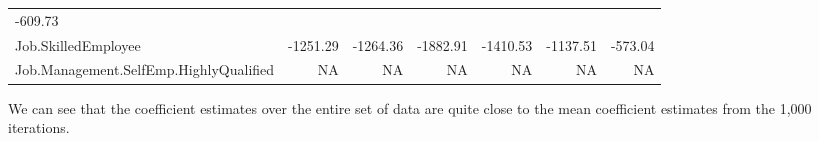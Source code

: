 \documentclass[]{article}
\begin{document}
\begin{longtable}[]{@{}lrrrrrr@{}}
\begin{minipage}[t]{0.08\columnwidth}
-609.73\strut
\end{minipage}\tabularnewline
\begin{minipage}[t]{0.31\columnwidth}\raggedright\strut
Job.SkilledEmployee\strut
\end{minipage} & \begin{minipage}[t]{0.10\columnwidth}\raggedleft\strut
-1251.29\strut
\end{minipage} & \begin{minipage}[t]{0.08\columnwidth}\raggedleft\strut
-1264.36\strut
\end{minipage} & \begin{minipage}[t]{0.08\columnwidth}\raggedleft\strut
-1882.91\strut
\end{minipage} & \begin{minipage}[t]{0.08\columnwidth}\raggedleft\strut
-1410.53\strut
\end{minipage} & \begin{minipage}[t]{0.08\columnwidth}\raggedleft\strut
-1137.51\strut
\end{minipage} & \begin{minipage}[t]{0.08\columnwidth}\raggedleft\strut
-573.04\strut
\end{minipage}\tabularnewline
\begin{minipage}[t]{0.31\columnwidth}\raggedright\strut
Job.Management.SelfEmp.HighlyQualified\strut
\end{minipage} & \begin{minipage}[t]{0.10\columnwidth}\raggedleft\strut
NA\strut
\end{minipage} & \begin{minipage}[t]{0.08\columnwidth}\raggedleft\strut
NA\strut
\end{minipage} & \begin{minipage}[t]{0.08\columnwidth}\raggedleft\strut
NA\strut
\end{minipage} & \begin{minipage}[t]{0.08\columnwidth}\raggedleft\strut
NA\strut
\end{minipage} & \begin{minipage}[t]{0.08\columnwidth}\raggedleft\strut
NA\strut
\end{minipage} & \begin{minipage}[t]{0.08\columnwidth}\raggedleft\strut
NA\strut
\end{minipage}\tabularnewline
\bottomrule
\end{longtable}

We can see that the coefficient estimates over the entire set of data
are quite close to the mean coefficient estimates from the 1,000
iterations.
\end{document}

